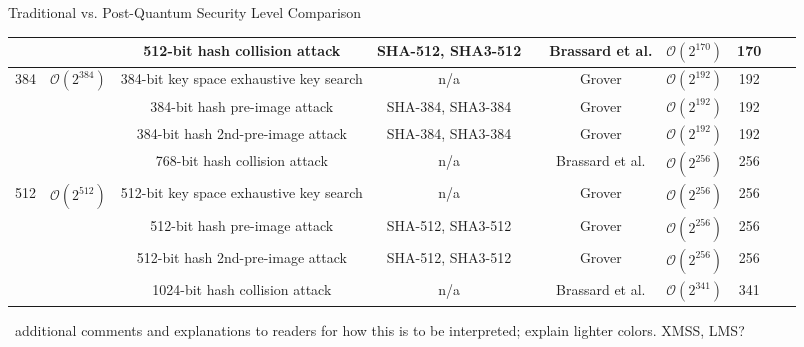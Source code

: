 \begin{algorithmbox}{Traditional vs. Post-Quantum Security Level Comparison \tbv}
\begin{center}
\begin{tabular}{cc|ccc|ccccc}
        &  & 512-bit hash collision attack & SHA-512, SHA3-512 &  & Brassard et al. & $\mathcal{O}\left(2^{170}\right)$ & 170 &  & \\
        \hline
        \multirow{4}{*}[-2.5mm]{384} & \multirow{4}{*}[-2.5mm]{$\mathcal{O}\left(2^{384}\right)$} & 384-bit key space exhaustive key search & n/a &  & Grover & $\mathcal{O}\left(2^{192}\right)$ & 192 &  & \\
        &  & 384-bit hash pre-image attack & SHA-384, SHA3-384 &  & Grover & $\mathcal{O}\left(2^{192}\right)$ & 192 &  & \\
        &  & 384-bit hash 2nd-pre-image attack & SHA-384, SHA3-384 &  & Grover & $\mathcal{O}\left(2^{192}\right)$ & 192 & & \\
        &  & 768-bit hash collision attack & n/a &  & Brassard et al. & $\mathcal{O}\left(2^{256}\right)$ & 256 &  & \\
        \hline
        \multirow{4}{*}[-2.5mm]{512} & \multirow{4}{*}[-2.5mm]{$\mathcal{O}\left(2^{512}\right)$} & 512-bit key space exhaustive key search & n/a &  & Grover & $\mathcal{O}\left(2^{256}\right)$ & 256 &  & \\
        &  & 512-bit hash pre-image attack & SHA-512, SHA3-512 &  & Grover & $\mathcal{O}\left(2^{256}\right)$ & 256 &  & \\
        &  & 512-bit hash 2nd-pre-image attack & SHA-512, SHA3-512 &  & Grover & $\mathcal{O}\left(2^{256}\right)$ & 256 & & \\
        &  & 1024-bit hash collision attack & n/a &  & Brassard et al. & $\mathcal{O}\left(2^{341}\right)$ & 341 &  & \\
        \hline
        \end{tabular}
    \end{center}
    \scriptsize
    \tbd\ additional comments and explanations to readers for how this is to be interpreted; explain lighter colors. XMSS, LMS?
\end{algorithmbox}




